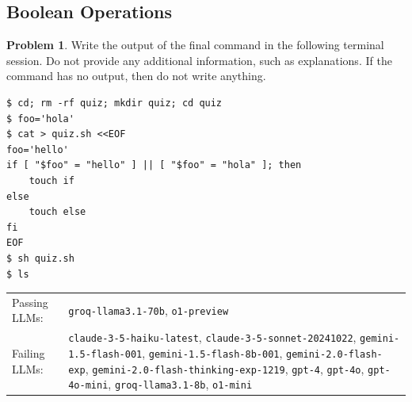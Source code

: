 \documentclass[10pt]{article}
\theoremstyle{definition}
\newtheorem{problem}{Problem}
\begin{document}
\noindent\vspace{0.1in}\begin{minipage}{\textwidth}
\subsection{Boolean Operations}

\begin{problem}
Write the output of the final command in the following terminal session.
Do not provide any additional information,
such as explanations.
If the command has no output,
then do not write anything.

\end{problem}
\begin{lstlisting}
$ cd; rm -rf quiz; mkdir quiz; cd quiz
$ foo='hola'
$ cat > quiz.sh <<EOF
foo='hello'
if [ "$foo" = "hello" ] || [ "$foo" = "hola" ]; then
    touch if
else
    touch else
fi
EOF
$ sh quiz.sh
$ ls
\end{lstlisting}


\noindent
\begin{tabular}{p{1.0in}L{5in}}
Passing LLMs: & {\lstinline$groq-llama3.1-70b$}, {\lstinline$o1-preview$} \\
Failing LLMs: & {\lstinline$claude-3-5-haiku-latest$}, {\lstinline$claude-3-5-sonnet-20241022$}, {\lstinline$gemini-1.5-flash-001$}, {\lstinline$gemini-1.5-flash-8b-001$}, {\lstinline$gemini-2.0-flash-exp$}, {\lstinline$gemini-2.0-flash-thinking-exp-1219$}, {\lstinline$gpt-4$}, {\lstinline$gpt-4o$}, {\lstinline$gpt-4o-mini$}, {\lstinline$groq-llama3.1-8b$}, {\lstinline$o1-mini$} \\
\end{tabular}

\end{minipage}
\end{document}
